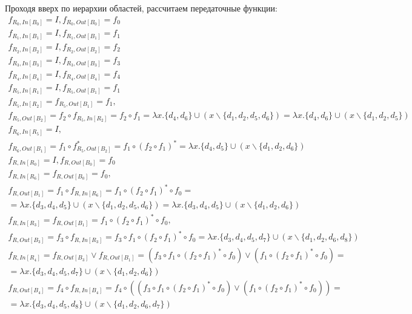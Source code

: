 \documentclass[11pt]{article}
\begin{document}
Проходя вверх по иерархии областей, рассчитаем передаточные функции:
\begin{gather*}
f_{R_0, In[B_0]} = I, f_{R_0, Out[B_0]} = f_0 \\
f_{R_1, In[B_1]} = I, f_{R_1, Out[B_1]} = f_1 \\
f_{R_2, In[B_2]} = I, f_{R_2, Out[B_2]} = f_2 \\
f_{R_3, In[B_3]} = I, f_{R_3, Out[B_3]} = f_3 \\
f_{R_4, In[B_4]} = I, f_{R_4, Out[B_4]} = f_4 \\
f_{R_5, In[R_1]} = I, f_{R_5, Out[B_1]} = f_1 \\
f_{R_5, In[R_2]} = f_{R_5, Out[B_1]} = f_1, \\
f_{R_5, Out[B_2]} = f_2 \circ f_{R_5, In[R_2]} = f_2 \circ f_1 = \lambda x. \{d_4, d_6\} \cup (x \backslash \{d_1, d_2, d_5, d_6\}) = \lambda x. \{d_4, d_6\} \cup (x \backslash \{d_1, d_2, d_5\}) \\
f_{R_6, In[R_5]} = I, \\
f_{R_6, Out[B_1]} = f_1 \circ f_{R_5, Out[B_2]}^* = f_1 \circ (f_2 \circ f_1)^* = \lambda x. \{d_4, d_5\} \cup (x \backslash \{d_1, d_2, d_6\})
\end{gather*}
\begin{gather*}
f_{R, In[R_0]} = I, f_{R, Out[B_0]} = f_0 \\
f_{R, In[R_6]} = f_{R, Out[B_0]} = f_0, \\
f_{R, Out[B_1]} = f_1 \circ f_{R, In[R_6]} = f_1 \circ (f_2 \circ f_1)^* \circ f_0 = \\
= \lambda x. \{d_3, d_4, d_5\} \cup (x \backslash \{d_1, d_2, d_5, d_6\}) = \lambda x. \{d_3, d_4, d_5\} \cup (x \backslash \{d_1, d_2, d_6\}) \\
f_{R, In[R_3]} = f_{R, Out[B_1]} = f_1 \circ (f_2 \circ f_1)^* \circ f_0, \\
f_{R, Out[B_3]} = f_3 \circ f_{R, In[R_3]} = f_3 \circ f_1 \circ (f_2 \circ f_1)^* \circ f_0 = \lambda x. \{d_3, d_4, d_5, d_7\} \cup (x \backslash \{d_1, d_2, d_6, d_8\}) \\
f_{R, In[R_4]} = f_{R, Out[B_3]} \vee f_{R, Out[B_1]} = (f_3 \circ f_1 \circ (f_2 \circ f_1)^* \circ f_0) \vee (f_1 \circ (f_2 \circ f_1)^* \circ f_0) = \\
= \lambda x. \{d_3, d_4, d_5, d_7\} \cup (x \backslash \{d_1, d_2, d_6\}) \\
f_{R, Out[B_4]} = f_4 \circ f_{R, In[B_4]} = f_4 \circ ((f_3 \circ f_1 \circ (f_2 \circ f_1)^* \circ f_0) \vee (f_1 \circ (f_2 \circ f_1)^* \circ f_0)) = \\
= \lambda x. \{d_3, d_4, d_5, d_8\} \cup (x \backslash \{d_1, d_2, d_6, d_7\})
\end{gather*}
\end{document}
